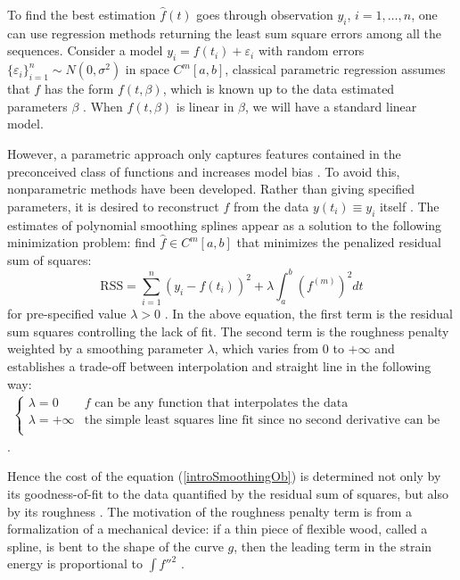To find the best estimation $\hat{f}(t)$ goes through observation $y_i$, $i=1,\ldots,n$, one can use regression methods returning the least sum square errors among all the sequences. Consider a model $y_i=f(t_i)+\varepsilon_i$ with random errors $\{\varepsilon_i\}_{i=1}^n \sim N(0,\sigma^2)$ in space $\mathit{C}^m[a,b]$, classical parametric regression assumes that $f$ has the form $f(t,\beta)$, which is known up to the data estimated parameters $\beta$ \cite{kim2004smoothing}. When $f(t,\beta)$ is linear in $\beta$, we will have a standard linear model. 


However, a parametric approach only captures features contained in the preconceived class of functions and increases model bias \cite{yao2005functional}. To avoid this, nonparametric methods have been developed. Rather than giving specified parameters, it is desired to reconstruct $f$ from the data $y(t_i)\equiv y_i$ itself  \cite{craven1978smoothing}. The estimates of polynomial smoothing splines appear as a solution to the following minimization problem: find $\hat{f} \in \mathit{C}^m[a,b]$ that minimizes the penalized residual sum of squares: 
\begin{equation}\label{introSmoothingOb}
\mbox{RSS}=\sum_{i=1}^{n}\left(  y_i-f(t_i)\right) ^2+\lambda\int_a^b \left(f^{(m)}\right)^2dt
\end{equation}
for pre-specified value $\lambda>0$ \cite{aydin2012smoothing}. In the above equation, the first term is the residual sum squares controlling the lack of fit. The second term is the roughness penalty weighted by a smoothing parameter $\lambda$, which varies from $0$ to $+\infty$ and establishes a trade-off between interpolation and straight line in the following way: 
\begin{align*}
\begin{cases}
\lambda = 0  & \mbox{$f$ can be any function that interpolates the data}\\
\lambda = +\infty & \mbox{the simple least squares line fit since no second derivative can be tolerated}\\
\end{cases}
\end{align*}\cite{esl2009}. 

Hence the cost of the equation (\ref{introSmoothingOb}) is determined not only by its goodness-of-fit to the data quantified by the residual sum of squares, but also by its roughness \cite{schwarz2012geodesy}. The motivation of the roughness penalty term is from a formalization of a mechanical device: if a thin piece of flexible wood, called a spline, is bent to the shape of the curve $g$, then the leading term in the strain energy is proportional to $\int f''^2$ \cite{green1993nonparametric}. 




